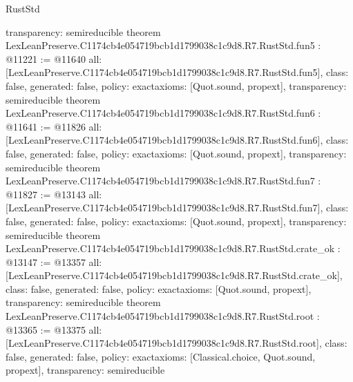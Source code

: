 \begin{lexlean}{RustStd}
\begin{coremodule}
{  transparency: semireducible
}
theorem LexLeanPreserve.C1174cb4e054719bcb1d1799038c1c9d8.R7.RustStd.fun5 : @11221 := @11640 {
  all: [LexLeanPreserve.C1174cb4e054719bcb1d1799038c1c9d8.R7.RustStd.fun5],
  class: false,
  generated: false,
  policy: exact{axioms: [Quot.sound, propext]},
  transparency: semireducible
}
theorem LexLeanPreserve.C1174cb4e054719bcb1d1799038c1c9d8.R7.RustStd.fun6 : @11641 := @11826 {
  all: [LexLeanPreserve.C1174cb4e054719bcb1d1799038c1c9d8.R7.RustStd.fun6],
  class: false,
  generated: false,
  policy: exact{axioms: [Quot.sound, propext]},
  transparency: semireducible
}
theorem LexLeanPreserve.C1174cb4e054719bcb1d1799038c1c9d8.R7.RustStd.fun7 : @11827 := @13143 {
  all: [LexLeanPreserve.C1174cb4e054719bcb1d1799038c1c9d8.R7.RustStd.fun7],
  class: false,
  generated: false,
  policy: exact{axioms: [Quot.sound, propext]},
  transparency: semireducible
}
theorem LexLeanPreserve.C1174cb4e054719bcb1d1799038c1c9d8.R7.RustStd.crate_ok : @13147 := @13357 {
  all: [LexLeanPreserve.C1174cb4e054719bcb1d1799038c1c9d8.R7.RustStd.crate_ok],
  class: false,
  generated: false,
  policy: exact{axioms: [Quot.sound, propext]},
  transparency: semireducible
}
theorem LexLeanPreserve.C1174cb4e054719bcb1d1799038c1c9d8.R7.RustStd.root : @13365 := @13375 {
  all: [LexLeanPreserve.C1174cb4e054719bcb1d1799038c1c9d8.R7.RustStd.root],
  class: false,
  generated: false,
  policy: exact{axioms: [Classical.choice, Quot.sound, propext]},
  transparency: semireducible
}


\end{coremodule}
\end{lexlean}
